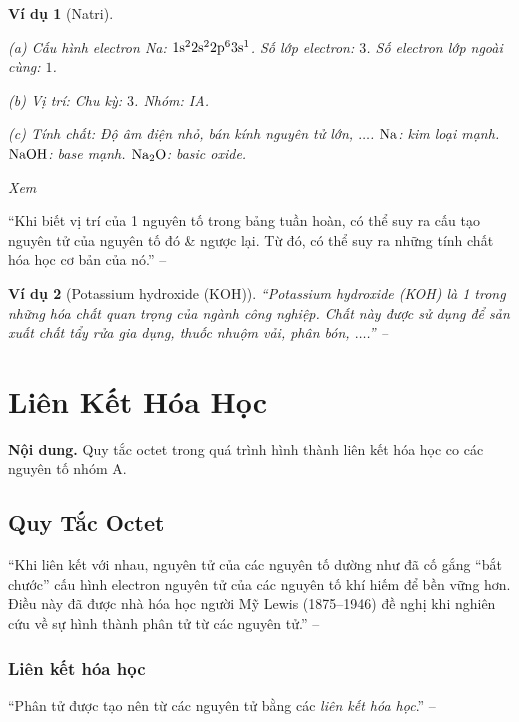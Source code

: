 \documentclass{article}
\numberwithin{equation}{section}
\newtheorem{vidu}{Ví dụ}[section]
\begin{document}
\begin{vidu}[Natri]
	\begin{enumerate*}
		\item[(a)] \emph{Cấu hình electron Na:} $\rm 1s^22s^22p^63s^1$. Số lớp electron: $3$. Số electron lớp ngoài cùng: $1$.
		\item[(b)] \emph{Vị trí:} Chu kỳ: $3$. Nhóm: IA.
		\item[(c)] \emph{Tính chất:} Độ âm điện nhỏ, bán kính nguyên tử lớn, $\ldots$. $\rm Na$: kim loại mạnh. $\rm NaOH$: base mạnh. $\rm Na_2O$: basic oxide.
	\end{enumerate*}
	Xem \cite[Hình 7.1: \textsf{Mối quan hệ vị trí, cấu hình electron \& tính chất của sodium}, p. 50]{SGK_Hoa_Hoc_10_Chan_Troi_Sang_Tao}
\end{vidu}
``Khi biết vị trí của 1 nguyên tố trong bảng tuần hoàn, có thể suy ra cấu tạo nguyên tử của nguyên tố đó \& ngược lại. Từ đó, có thể suy ra những tính chất hóa học cơ bản của nó.'' -- \cite[p. 51]{SGK_Hoa_Hoc_10_Chan_Troi_Sang_Tao}

\begin{vidu}[Potassium hydroxide (KOH)]
	``\emph{Potassium hydroxide (KOH)} là 1 trong những hóa chất quan trọng của ngành công nghiệp. Chất này được sử dụng để sản xuất chất tẩy rửa gia dụng, thuốc nhuộm vải, phân bón, $\ldots$.'' -- \cite[p. 51]{SGK_Hoa_Hoc_10_Chan_Troi_Sang_Tao}
\end{vidu}


\section{Liên Kết Hóa Học}
\textsf{\textbf{Nội dung.} Quy tắc octet trong quá trình hình thành liên kết hóa học co các nguyên tố nhóm A.}

\subsection{Quy Tắc Octet}
``Khi liên kết với nhau, nguyên tử của các nguyên tố dường như đã cố gắng ``bắt chước'' cấu hình electron nguyên tử của các nguyên tố khí hiếm để bền vững hơn. Điều này đã được nhà hóa học người Mỹ Lewis (1875--1946) đề nghị khi nghiên cứu về sự hình thành phân tử từ các nguyên tử.'' -- \cite[p. 52]{SGK_Hoa_Hoc_10_Chan_Troi_Sang_Tao}

\subsubsection{Liên kết hóa học}
``Phân tử được tạo nên từ các nguyên tử bằng các \textit{liên kết hóa học}.'' -- \cite[p. 53]{SGK_Hoa_Hoc_10_Chan_Troi_Sang_Tao}
\end{document}

